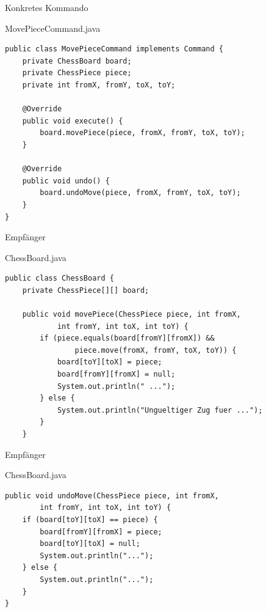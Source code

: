\begin{frame}[fragile]{Konkretes Kommando}
	\begin{exampleblock}{MovePieceCommand.java}
 		\begin{lstlisting}
public class MovePieceCommand implements Command {
    private ChessBoard board;
    private ChessPiece piece;
    private int fromX, fromY, toX, toY;

    @Override
    public void execute() {
        board.movePiece(piece, fromX, fromY, toX, toY);
    }

    @Override
    public void undo() {
        board.undoMove(piece, fromX, fromY, toX, toY);
    }
}
 		\end{lstlisting}
 	\end{exampleblock}
\end{frame}

\begin{frame}[fragile]{Empfänger}
	\begin{exampleblock}{ChessBoard.java}
 		\begin{lstlisting}
public class ChessBoard {
    private ChessPiece[][] board;

    public void movePiece(ChessPiece piece, int fromX, 
            int fromY, int toX, int toY) {
        if (piece.equals(board[fromY][fromX]) && 
                piece.move(fromX, fromY, toX, toY)) {
            board[toY][toX] = piece;
            board[fromY][fromX] = null;
            System.out.println(" ...");
        } else {
            System.out.println("Ungueltiger Zug fuer ...");
        }
    }
 		\end{lstlisting}
 	\end{exampleblock}
\end{frame}

\begin{frame}[fragile]{Empfänger}
	\begin{exampleblock}{ChessBoard.java}
 		\begin{lstlisting}
public void undoMove(ChessPiece piece, int fromX, 
        int fromY, int toX, int toY) {
    if (board[toY][toX] == piece) {
        board[fromY][fromX] = piece;
        board[toY][toX] = null;
        System.out.println("...");
    } else {
        System.out.println("...");
    }
}
 		\end{lstlisting}
 	\end{exampleblock}
\end{frame}